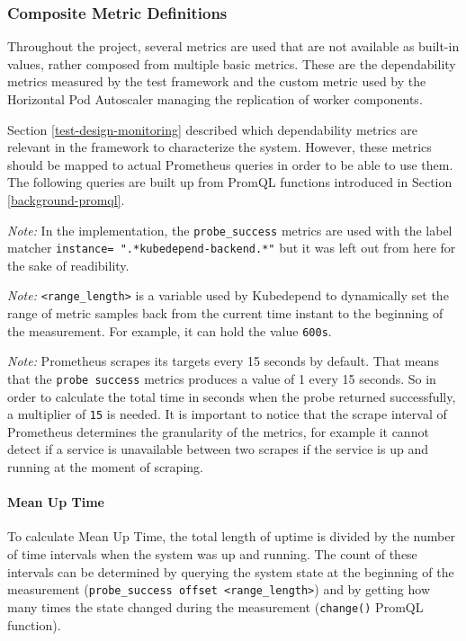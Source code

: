 \subsubsection{Composite Metric Definitions}

Throughout the project, several metrics are used that are not available as built-in values, rather composed from multiple basic metrics. These are the dependability metrics measured by the test framework and the custom metric used by the Horizontal Pod Autoscaler managing the replication of worker components.

 Section \ref{test-design-monitoring} described which dependability metrics are relevant in the framework to characterize the system. However, these metrics should be mapped to actual Prometheus queries in order to be able to use them. The following queries are built up from PromQL functions introduced in Section \ref{background-promql}.
 

\emph{Note:} In the implementation, the \texttt{probe\_success} metrics are used with the label matcher \texttt{instance=~".*kubedepend-backend.*"} but it was left out from here for the sake of readibility.

\emph{Note:} \texttt{<range\_length>} is a variable used by Kubedepend to dynamically set the range of metric samples back from the current time instant to the beginning of the measurement. For example, it can hold the value \texttt{600s}.

\emph{Note:} Prometheus scrapes its targets every 15 seconds by default. That means that the \texttt{probe\ success} metrics produces a value of 1 every 15 seconds. So in order to calculate the total time in seconds when the probe returned successfully, a multiplier of \texttt{15} is needed. It is important to notice that the scrape interval of Prometheus determines the granularity of the metrics, for example it cannot detect if a service is unavailable between two scrapes if the service is up and running at the moment of scraping.
 
 \paragraph{Mean Up Time} To calculate Mean Up Time, the total length of uptime is divided by the number of time intervals when the system was up and running. The count of these intervals can be determined by querying the system state at the beginning of the measurement (\texttt{probe\_success\ offset\ <range\_length>}) and by getting how many times the state changed during the measurement (\texttt{change()} PromQL function).
 
